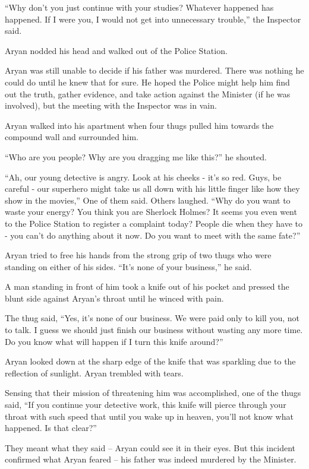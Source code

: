 “Why don't you just continue with your studies? Whatever happened has happened.
If I were you, I would not get into unnecessary trouble,” the Inspector said.

Aryan nodded his head and walked out of the Police Station.

Aryan was still unable to decide if his father was murdered. There was nothing
he could do until he knew that for sure. He hoped the Police might help him find
out the truth, gather evidence, and take action against the Minister (if he was
involved), but the meeting with the Inspector was in vain.

Aryan walked into his apartment when four thugs pulled him towards the compound
wall and surrounded him.

“Who are you people? Why are you dragging me like this?” he shouted.

“Ah, our young detective is angry. Look at his cheeks - it's so red. Guys, be
careful - our superhero might take us all down with his little finger like how
they show in the movies,” One of them said. Others laughed. “Why do you want to
waste your energy? You think you are Sherlock Holmes? It seems you even went to
the Police Station to register a complaint today? People die when they have to -
you can't do anything about it now. Do you want to meet with the same fate?”

Aryan tried to free his hands from the strong grip of two thugs who were
standing on either of his sides. “It's none of your business,” he said.

A man standing in front of him took a knife out of his pocket and pressed the
blunt side against Aryan's throat until he winced with pain.

The thug said, “Yes, it's none of our business. We were paid only to kill you,
not to talk. I guess we should just finish our business without wasting any more
time. Do you know what will happen if I turn this knife around?”

Aryan looked down at the sharp edge of the knife that was sparkling due to the
reflection of sunlight. Aryan trembled with tears.

Sensing that their mission of threatening him was accomplished, one of the thugs
said, “If you continue your detective work, this knife will pierce through your
throat with such speed that until you wake up in heaven, you'll not know what
happened. Is that clear?”

They meant what they said – Aryan could see it in their eyes. But this incident
confirmed what Aryan feared – his father was indeed murdered by the Minister.